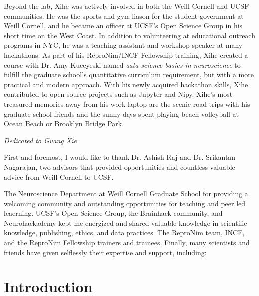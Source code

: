 \documentclass[phd,tocprelim]{cornell}
\begin{document}
\begin{biosketch}
Beyond the lab, Xihe was actively involved in both the Weill Cornell and UCSF communities. He was the sports and gym liason for the student government at Weill Cornell, and he became an officer at UCSF's Open Science Group in his short time on the West Coast. In addition to volunteering at educational outreach programs in NYC, he was a teaching assistant and workshop speaker at many hackathons. As part of his ReproNim/INCF Fellowship training, Xihe created a course with Dr. Amy Kuceyeski named \emph{data science basics in neuroscience} to fulfill the graduate school's quantitative curriculum requirement, but with a more practical and modern approach. With his newly acquired hackathon skills, Xihe contributed to open source projects such as Jupyter and Nipy. Xihe's most treasured memories away from his work laptop are the scenic road trips with his graduate school friends and the sunny days spent playing beach volleyball at Ocean Beach or Brooklyn Bridge Park.
\end{biosketch}

\begin{dedication}
\emph{Dedicated to Guang Xie}
\end{dedication}

\begin{acknowledgements}
First and foremost, I would like to thank Dr. Ashish Raj and Dr. Srikantan Nagarajan, two advisors that provided opportunities and countless valuable advice from Weill Cornell to UCSF. 

The Neuroscience Department at Weill Cornell Graduate School for providing a welcoming community and outstanding opportunities for teaching and peer led leaerning. UCSF's Open Science Group, the Brainhack community, and Neurohackademy kept me energized and shared valuable knowledge in scientific knowledge, publishing, ethics, and data practices. The ReproNim team, INCF, and the ReproNim Fellowship trainers and trainees. Finally, many scientists and friends have given selflessly their expertise and support, including: 
\end{acknowledgements}

\contentspage
\tablelistpage
\figurelistpage

\normalspacing \setcounter{page}{1} 
\pagestyle{cornell} \addtolength{\parskip}{0.5\baselineskip}

\chapter{Introduction}

\end{document}
